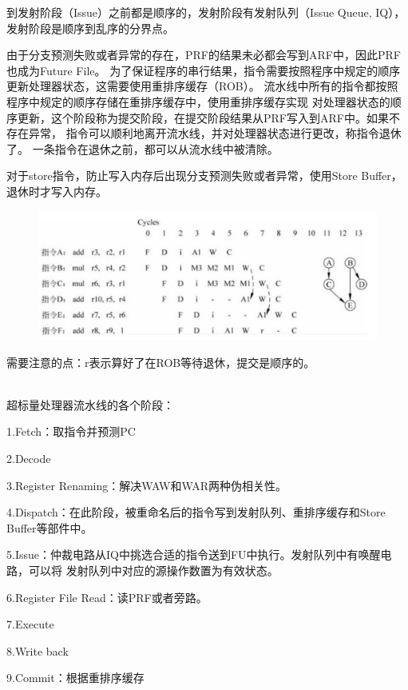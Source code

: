 \documentclass{article}
\begin{document}
  到发射阶段（Issue）之前都是顺序的，发射阶段有发射队列（Issue Queue, IQ），
  发射阶段是顺序到乱序的分界点。

  由于分支预测失败或者异常的存在，PRF的结果未必都会写到ARF中，因此PRF也成为Future File。
  为了保证程序的串行结果，指令需要按照程序中规定的顺序更新处理器状态，这需要使用重排序缓存（ROB）。
  流水线中所有的指令都按照程序中规定的顺序存储在重排序缓存中，使用重排序缓存实现
  对处理器状态的顺序更新，这个阶段称为提交阶段，在提交阶段结果从PRF写入到ARF中。如果不存在异常，
  指令可以顺利地离开流水线，并对处理器状态进行更改，称指令退休了。  一条指令在退休之前，都可以从流水线中被清除。

  对于store指令，防止写入内存后出现分支预测失败或者异常，使用Store Buffer，退休时才写入内存。

  \begin{figure}[H]
    \centering
    \includegraphics*[width=14cm]{./figures/chap1_oor_prog.jpg}
  \end{figure}

  需要注意的点：r表示算好了在ROB等待退休，提交是顺序的。

  ~\\

  超标量处理器流水线的各个阶段：

  1.Fetch：取指令并预测PC

  2.Decode

  3.Register Renaming：解决WAW和WAR两种伪相关性。

  4.Dispatch：在此阶段，被重命名后的指令写到发射队列、重排序缓存和Store Buffer等部件中。
  
  5.Issue：仲裁电路从IQ中挑选合适的指令送到FU中执行。发射队列中有唤醒电路，可以将
  发射队列中对应的源操作数置为有效状态。

  6.Register File Read：读PRF或者旁路。

  7.Execute

  8.Write back

  9.Commit：根据重排序缓存
\end{document}
